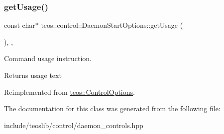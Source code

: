 \subsubsection{\texorpdfstring{get\+Usage()}{getUsage()}}
{\footnotesize\ttfamily const char$\ast$ teos\+::control\+::\+Daemon\+Start\+Options\+::get\+Usage (\begin{DoxyParamCaption}{ }\end{DoxyParamCaption})\hspace{0.3cm}{\ttfamily [inline]}, {\ttfamily [protected]}, {\ttfamily [virtual]}}



Command \textquotesingle{}usage\textquotesingle{} instruction. 

\begin{DoxyReturn}{Returns}
usage text 
\end{DoxyReturn}


Reimplemented from \mbox{\hyperlink{classteos_1_1_control_options_a0aa5671f9bc750ed5280c26c543874f3}{teos\+::\+Control\+Options}}.



The documentation for this class was generated from the following file\+:\begin{DoxyCompactItemize}
\item 
include/teoslib/control/daemon\+\_\+controls.\+hpp\end{DoxyCompactItemize}
